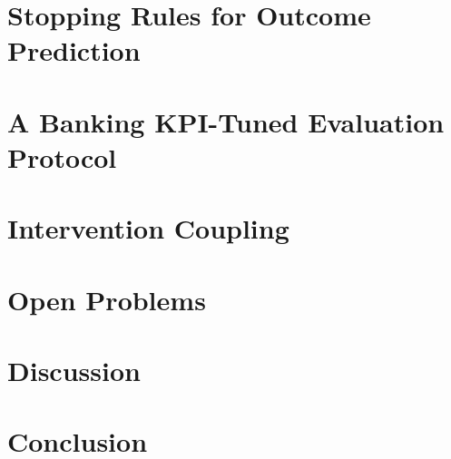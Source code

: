 \documentclass[11pt,a4paper]{article}
\begin{document}
\section{Stopping Rules for Outcome Prediction}
\label{sec:stopping}


\section{A Banking KPI-Tuned Evaluation Protocol}
\label{sec:evaluation}


\section{Intervention Coupling}
\label{sec:intervention}


\section{Open Problems}
\label{sec:open_problems}


\section{Discussion}
\label{sec:discussion}


\section{Conclusion}
\label{sec:conclusion}




\end{document}
